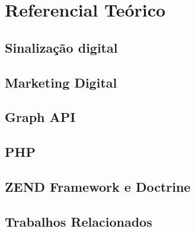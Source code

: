 
\chapter[Referencial Teórico]{Referencial Teórico}

\section{Sinalização digital}
\section{Marketing Digital}
\section{Graph API}
\section{PHP}
\section{ZEND Framework e Doctrine}
\section{Trabalhos Relacionados}


